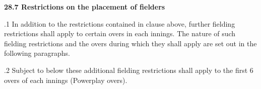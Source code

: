 \documentclass[12pt]{article}
\begin{document}
\vspace{\baselineskip}

\vspace{\baselineskip}

\vspace{\baselineskip}

\vspace{\baselineskip}

\vspace{\baselineskip}

\vspace{\baselineskip}

\vspace{\baselineskip}

\vspace{\baselineskip}
\begin{Center}
{\fontsize{8pt}{9.6pt}\par}
\end{Center}\par


\vspace{\baselineskip}
{\fontsize{11pt}{13.2pt}\selectfont \textbf{28.7 \tabto{0.47in} Restrictions on the placement of fielders}\par}\par


\vspace{\baselineskip}
\begin{adjustwidth}{0.5in}{0.0in}
\begin{justify}
{\fontsize{9pt}{10.8pt}.1 \tabto{0.49in} In addition to the restrictions contained in clause above, further fielding restrictions shall apply to certain overs in each innings. The nature of such fielding restrictions and the overs during which they shall apply are set out in the following paragraphs.\par}
\end{justify}\par

\end{adjustwidth}


\vspace{\baselineskip}
\begin{adjustwidth}{0.5in}{0.19in}
{\fontsize{9pt}{10.8pt}.2 \tabto{0.49in} Subject to below these additional fielding restrictions shall apply to the first 6 overs of each innings (Powerplay overs).\par}\par

\end{adjustwidth}
\end{document}
